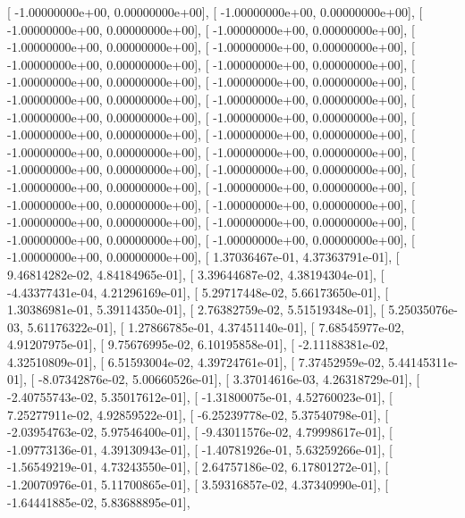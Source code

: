 \documentclass{article}
\begin{document}
       [ -1.00000000e+00,   0.00000000e+00],
       [ -1.00000000e+00,   0.00000000e+00],
       [ -1.00000000e+00,   0.00000000e+00],
       [ -1.00000000e+00,   0.00000000e+00],
       [ -1.00000000e+00,   0.00000000e+00],
       [ -1.00000000e+00,   0.00000000e+00],
       [ -1.00000000e+00,   0.00000000e+00],
       [ -1.00000000e+00,   0.00000000e+00],
       [ -1.00000000e+00,   0.00000000e+00],
       [ -1.00000000e+00,   0.00000000e+00],
       [ -1.00000000e+00,   0.00000000e+00],
       [ -1.00000000e+00,   0.00000000e+00],
       [ -1.00000000e+00,   0.00000000e+00],
       [ -1.00000000e+00,   0.00000000e+00],
       [ -1.00000000e+00,   0.00000000e+00],
       [ -1.00000000e+00,   0.00000000e+00],
       [ -1.00000000e+00,   0.00000000e+00],
       [ -1.00000000e+00,   0.00000000e+00],
       [ -1.00000000e+00,   0.00000000e+00],
       [ -1.00000000e+00,   0.00000000e+00],
       [ -1.00000000e+00,   0.00000000e+00],
       [ -1.00000000e+00,   0.00000000e+00],
       [ -1.00000000e+00,   0.00000000e+00],
       [ -1.00000000e+00,   0.00000000e+00],
       [ -1.00000000e+00,   0.00000000e+00],
       [ -1.00000000e+00,   0.00000000e+00],
       [ -1.00000000e+00,   0.00000000e+00],
       [ -1.00000000e+00,   0.00000000e+00],
       [ -1.00000000e+00,   0.00000000e+00],
       [  1.37036467e-01,   4.37363791e-01],
       [  9.46814282e-02,   4.84184965e-01],
       [  3.39644687e-02,   4.38194304e-01],
       [ -4.43377431e-04,   4.21296169e-01],
       [  5.29717448e-02,   5.66173650e-01],
       [  1.30386981e-01,   5.39114350e-01],
       [  2.76382759e-02,   5.51519348e-01],
       [  5.25035076e-03,   5.61176322e-01],
       [  1.27866785e-01,   4.37451140e-01],
       [  7.68545977e-02,   4.91207975e-01],
       [  9.75676995e-02,   6.10195858e-01],
       [ -2.11188381e-02,   4.32510809e-01],
       [  6.51593004e-02,   4.39724761e-01],
       [  7.37452959e-02,   5.44145311e-01],
       [ -8.07342876e-02,   5.00660526e-01],
       [  3.37014616e-03,   4.26318729e-01],
       [ -2.40755743e-02,   5.35017612e-01],
       [ -1.31800075e-01,   4.52760023e-01],
       [  7.25277911e-02,   4.92859522e-01],
       [ -6.25239778e-02,   5.37540798e-01],
       [ -2.03954763e-02,   5.97546400e-01],
       [ -9.43011576e-02,   4.79998617e-01],
       [ -1.09773136e-01,   4.39130943e-01],
       [ -1.40781926e-01,   5.63259266e-01],
       [ -1.56549219e-01,   4.73243550e-01],
       [  2.64757186e-02,   6.17801272e-01],
       [ -1.20070976e-01,   5.11700865e-01],
       [  3.59316857e-02,   4.37340990e-01],
       [ -1.64441885e-02,   5.83688895e-01],
\end{document}
